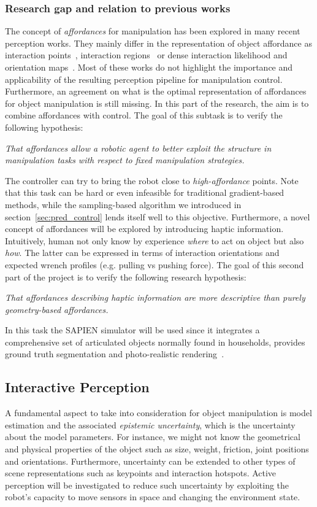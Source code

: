 \subsubsection{Research gap and relation to previous works}
The concept of \emph{affordances} for manipulation has been explored in many recent perception works. They mainly differ in the representation of object affordance as interaction points~\cite{gao2021kpam}, interaction regions~\cite{nagarajan2019grounded} or dense interaction likelihood and orientation maps~\cite{mo2021where2act}. Most of these works do not highlight the importance and applicability of the resulting perception pipeline for manipulation control. Furthermore, an agreement on what is the optimal representation of affordances for object manipulation is still missing. In this part of the research, the aim is to combine affordances with control. The goal of this subtask is to verify the following hypothesis:
\begin{displayquote}
\textit{That affordances allow a robotic agent to better exploit the structure in manipulation tasks with respect to fixed manipulation strategies.}
\end{displayquote}
The controller can try to bring the robot close to \emph{high-affordance} points. Note that this task can be hard or even infeasible for traditional gradient-based methods, while the sampling-based algorithm we introduced in section~\ref{sec:pred_control} lends itself well to this objective. 
Furthermore, a novel concept of affordances will be explored by introducing haptic information. Intuitively, human not only know by experience \emph{where} to act on object but also \emph{how}. The latter can be expressed in terms of interaction orientations and expected wrench profiles (e.g. pulling vs pushing force). The goal of this second part of the project is to verify the following research hypothesis:
\begin{displayquote}
\textit{That affordances describing haptic information are more descriptive than purely geometry-based affordances.}
\end{displayquote} 
In this task the SAPIEN simulator will be used since it integrates a comprehensive set of articulated objects normally found in households, provides ground truth segmentation and photo-realistic rendering~\cite{Xiang_2020_SAPIEN}. 

\subsection{Interactive Perception}
A fundamental aspect to take into consideration for object manipulation is model estimation and the associated \emph{epistemic uncertainty}, which is the uncertainty about the model parameters. For instance, we might not know the geometrical and physical properties of the object such as size, weight, friction, joint positions and orientations. Furthermore, uncertainty can be extended to other types of scene representations such as keypoints and interaction hotspots. Active perception will be investigated to reduce such uncertainty by exploiting the robot's capacity to move sensors in space and changing the environment state.

